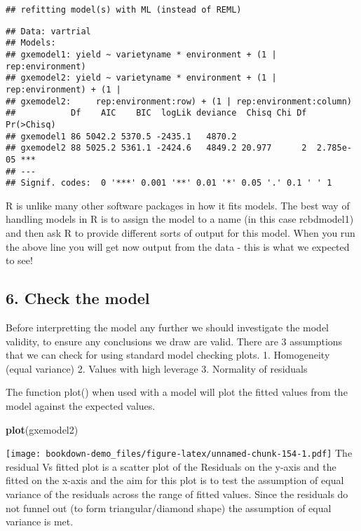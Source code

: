 \documentclass[]{book}
\newenvironment{Shaded}{\begin{snugshade}}{\end{snugshade}}
\newcommand{\KeywordTok}[1]{\textcolor[rgb]{0.13,0.29,0.53}{\textbf{#1}}}
\newcommand{\NormalTok}[1]{#1}
\theoremstyle{definition}
\theoremstyle{definition}
\theoremstyle{definition}
\theoremstyle{remark}
\begin{document}
\begin{verbatim}
## refitting model(s) with ML (instead of REML)
\end{verbatim}

\begin{verbatim}
## Data: vartrial
## Models:
## gxemodel1: yield ~ varietyname * environment + (1 | rep:environment)
## gxemodel2: yield ~ varietyname * environment + (1 | rep:environment) + (1 | 
## gxemodel2:     rep:environment:row) + (1 | rep:environment:column)
##           Df    AIC    BIC  logLik deviance  Chisq Chi Df Pr(>Chisq)    
## gxemodel1 86 5042.2 5370.5 -2435.1   4870.2                             
## gxemodel2 88 5025.2 5361.1 -2424.6   4849.2 20.977      2  2.785e-05 ***
## ---
## Signif. codes:  0 '***' 0.001 '**' 0.01 '*' 0.05 '.' 0.1 ' ' 1
\end{verbatim}

R is unlike many other software packages in how it fits models. The best
way of handling models in R is to assign the model to a name (in this
case rcbdmodel1) and then ask R to provide different sorts of output for
this model. When you run the above line you will get now output from the
data - this is what we expected to see!

\subsection{6. Check the model}\label{check-the-model-4}

Before interpretting the model any further we should investigate the
model validity, to ensure any conclusions we draw are valid. There are 3
assumptions that we can check for using standard model checking plots.
1. Homogeneity (equal variance) 2. Values with high leverage 3.
Normality of residuals

The function plot() when used with a model will plot the fitted values
from the model against the expected values.

\begin{Shaded}
\begin{Highlighting}[]
\KeywordTok{plot}\NormalTok{(gxemodel2)}
\end{Highlighting}
\end{Shaded}

\texttt{[image: bookdown-demo\_files/figure-latex/unnamed-chunk-154-1.pdf]}
The residual Vs fitted plot is a scatter plot of the Residuals on the
y-axis and the fitted on the x-axis and the aim for this plot is to test
the assumption of equal variance of the residuals across the range of
fitted values. Since the residuals do not funnel out (to form
triangular/diamond shape) the assumption of equal variance is met.
\end{document}
